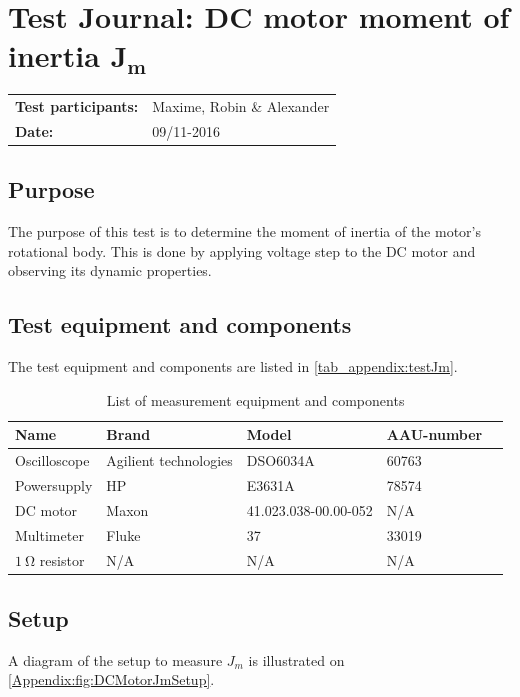 \chapter{Test Journal: DC motor moment of inertia $\boldsymbol{J_m}$}\label{appendix:TJDCMotorMomentofinertia}
\begin{table}[!h]
\begin{tabular}{l l}
\textbf{Test participants:} & Maxime, Robin \& Alexander\\
\textbf{Date:}  & 09/11-2016
\end{tabular}
\end{table}

\section*{Purpose}
The purpose of this test is to determine the moment of inertia of the motor's rotational body. This is done by applying voltage step to the DC motor and observing its dynamic properties.
\section*{Test equipment and components}
The test equipment and components are listed in \autoref{tab_appendix:testJm}.
\begin{table}[h]
	\centering
	\caption{List of measurement equipment and components}

	\begin{tabularx}{\textwidth}{lXXXX}
		Name 				& Brand	& Model & AAU-number\\ \toprule \rowcolor{lightGrey}
		Oscilloscope	& Agilient technologies & DSO6034A & 60763	\\
		Powersupply	& HP & E3631A & 78574\\ \rowcolor{lightGrey}
		DC motor & Maxon & 41.023.038-00.00-052& N/A \\ 
		Multimeter & Fluke & 37 & 33019\\\rowcolor{lightGrey}
		$\SI{1}{\ohm}$ resistor	& N/A & N/A & N/A
	\end{tabularx}
\end{table}\label{tab_appendix:testJm}
\section*{Setup}
A diagram of the setup to measure $J_m$ is illustrated on \autoref{Appendix:fig:DCMotorJmSetup}.

